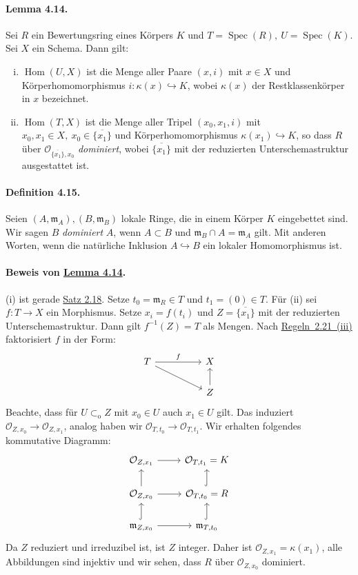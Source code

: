 \documentclass[11pt,b5paper,openany]{memoir}
\begin{document}
\paragraph{Lemma 4.14.}\label{4.14} Sei $R$ ein Bewertungsring eines Körpers $K$ und $T=\operatorname{Spec}(R),\ U=\operatorname{Spec}(K)$. Sei $X$ ein Schema. Dann gilt:
\begin{enumerate}[(i)]
\item $\operatorname{Hom}(U,X)$ ist die Menge aller Paare $(x,i)$ mit $x\in X$ und Körperhomomorphismus $i:\kappa(x)\hookrightarrow K$, wobei $\kappa(x)$ der Restklassenkörper in $x$ bezeichnet.
\item $\operatorname{Hom}(T,X)$ ist die Menge aller Tripel $(x_0,x_1,i)$ mit $x_0,x_1\in X,\ x_0\in\overline{\{x_1\}}$ und Körperhomomorphismus $\kappa(x_1)\hookrightarrow K$, so dass $R$ über $\mathcal{O}_{\overline{\{x_1\}},x_0}$ \textit{dominiert}, wobei $\overline{\{x_1\}}$ mit der reduzierten Unterschemastruktur ausgestattet ist.
\end{enumerate}

\paragraph{Definition 4.15.}\label{4.15} Seien $(A,\mathfrak{m}_A),(B,\mathfrak{m}_B)$ lokale Ringe, die in einem Körper $K$ eingebettet sind. Wir sagen $B$ \textit{dominiert} $A$, wenn $A\subset B$ und $\mathfrak{m}_B\cap A=\mathfrak{m}_A$ gilt. Mit anderen Worten, wenn die natürliche Inklusion $A\hookrightarrow B$ ein lokaler Homomorphismus ist.

\paragraph{Beweis von \hyperref[4.14]{Lemma 4.14}.} (i) ist gerade \hyperref[2.18]{Satz 2.18}. Setze $t_0=\mathfrak{m}_R\in T$ und $t_1=(0)\in T$. Für (ii) sei $f:T\to X$ ein Morphismus. Setze $x_i=f(t_i)$ und $Z=\overline{\{x_1\}}$ mit der reduzierten Unterschemastruktur. Dann gilt $f^{-1}(Z)=T$ als Mengen. Nach \hyperref[2.21]{Regeln~2.21~(iii)} faktorisiert $f$ in der Form:
\[\begin{tikzcd}
T\ar[rr, "f"]\ar[rrd] &&X\\
&& Z\ar[u]
\end{tikzcd} \]
Beachte, dass für $U\subset_\text{o} Z$ mit $x_0\in U$ auch $x_1\in U$ gilt. Das induziert $\mathcal{O}_{Z,x_0}\to\mathcal{O}_{Z,x_1}$, analog haben wir $\mathcal{O}_{T,t_0}\to\mathcal{O}_{T,t_1}$. Wir erhalten folgendes kommutative Diagramm:
\[\begin{tikzcd}
\mathcal{O}_{Z,x_1} \ar[r]& \mathcal{O}_{T,t_1}=K\\
\mathcal{O}_{Z,x_0} \ar[r]\ar[u]& \mathcal{O}_{T,t_0}=R\ar[u, hook]\\
\mathfrak{m}_{Z,x_0}\ar[r]\ar[u, hook] & \mathfrak{m}_{T,t_0}\ar[u, hook]
\end{tikzcd}\]
Da $Z$ reduziert und irreduzibel ist, ist $Z$ integer. Daher ist $\mathcal{O}_{Z,x_1}=\kappa(x_1)$, alle Abbildungen sind injektiv und wir sehen, dass $R$ über $\mathcal{O}_{Z,x_0}$ dominiert.
\end{document}
